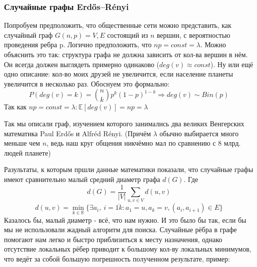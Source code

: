 \subsubsection{Случайные графы Erdős–Rényi}
Попробуем предположить, что общественные сети можно
представить, как случайный граф $G(n, p) = {V, E}$ состоящий из $n$ вершин, с
вероятностью проведения ребра p. Логично предположить, что $np = const = \lambda$.
Можно объяснить это так: структура графа не должна зависить от кол-ва
вершин в нём. Он всегда должен выглядеть примерно одинаково ($deg(v) \approx const$). Ну или ещё
одно описание: кол-во моих друзей не увеличится, если население планеты 
увеличится в несколько раз. Обоснуем это формально:
\begin{equation}
    P(deg(v) = k) = \binom{n}{k}p^k(1-p)^{1-k}
    \Rightarrow deg(v) \sim Bin(p)
\end{equation}
Так как $np = const = \lambda : \mathbb{E}[deg(v)] = np = \lambda$

Так мы описали граф, изучением которого занимались
два великих Венгерских математика Paul Erdős и Alfréd Rényi. (Причём $\lambda$ обычно
выбирается много меньше чем $n$, ведь наш круг общения никчёмно мал по сравнению с 8 млрд. людей
планете) 

Разультаты, к которым пршли данные математики показали, что случайные графы имеют 
сравнительно малый средний диаметр графа $d(G)$. Где
\begin{equation}
    d(G) = \frac{1}{|V|}\sum_{u, v \in V}d(u, v)
\end{equation}
\begin{equation}
    d(u, v) = \min_{k \in \mathbb{R}}\{\exists a_i, \ i = \overline{1k}  : a_1 = u, a_k = v, (a_i, a_{i + 1}) \in E\}
\end{equation}
Казалось бы, малый диаметр - всё, что нам нужно. И это было бы так, если бы мы не 
использовали жадный алгоритм для поиска. Случайные рёбра в графе помогают 
нам легко и быстро приблизиться к месту назначения, однако отсутствие локальных
рёбер приводит к большому кол-ву локальных минимумов, что ведёт за собой большую
погрешность полученном результате, пример:

